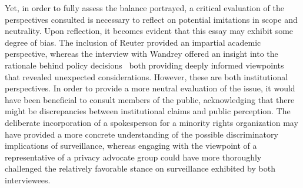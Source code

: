 \documentclass[12pt]{article}
\begin{document}
	Yet, in order to fully assess the balance portrayed, a critical evaluation of the perspectives consulted is necessary to reflect on potential imitations in scope and neutrality. Upon reflection, it becomes evident that this essay may exhibit some degree of bias. The inclusion of Reuter provided an impartial academic perspective, whereas the interview with Wandrey offered an insight into the rationale behind policy decisions \textemdash\ both providing deeply informed viewpoints that revealed unexpected considerations. However, these are both institutional perspectives. In order to provide a more neutral evaluation of the issue, it would have been beneficial to consult members of the public, acknowledging that there might be discrepancies between institutional claims and public perception. The deliberate incorporation of a spokesperson for a minority rights organization may have provided a more concrete understanding of the possible discriminatory implications of surveillance, whereas engaging with the viewpoint of a representative of a privacy advocate group could have more thoroughly challenged the relatively favorable stance on surveillance exhibited by both interviewees. 
	
	
	
	
	\clearpage
	
	\printbibliography
	
	\clearpage
	
\end{document}
